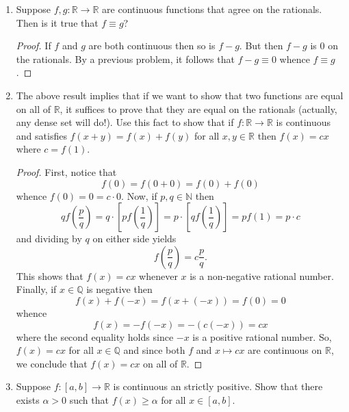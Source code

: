 \documentclass[12pt, reqno]{article}
\numberwithin{equation}{section}
\theoremstyle{definition}
\theoremstyle{remark}
\newcommand{\NN}{\mathbb{N}}
\newcommand{\QQ}{\mathbb{Q}}
\newcommand{\RR}{\mathbb{R}}
\newcommand{\abs}[1]{\left\lvert#1\right\rvert}
\renewcommand{\epsilon}{\varepsilon}
\begin{document}
\begin{enumerate}[leftmargin=*]
\begin{proof}
		      On the other hand, since $f$ is bounded, the Bolzano-Weierstrass theorem implies that $f(x_n)$ has a convergent subsequence $f(x_{n_k})$. By assumption,
		      \[
			      \lim_{n\to\infty} f(x_{n_k}) = L.
		      \]
		      But this contradicts the fact that $\abs{f(x_{n_k}) - L} \geq \epsilon$ for all $k\in\NN$.
	      \end{proof}

	\item Suppose $f, g :\RR\to\RR$ are continuous functions that agree on the rationals. Then is it true that $f \equiv g$?

	      \begin{proof}
		      If $f$ and $g$ are both continuous then so is $f-g$. But then $f-g$ is $0$ on the rationals. By a previous problem, it follows that $f - g\equiv 0$ whence $f\equiv g$.
	      \end{proof}

	\item The above result implies that if we want to show that two functions are equal on all of $\RR$, it suffices to prove that they are equal on the rationals (actually, any dense set will do!). Use this fact to show that if $f:\RR\to\RR$ is continuous and satisfies $f(x+y) = f(x) + f(y)$ for all $x,y\in\RR$ then $f(x) = cx$ where $c = f(1)$.

	      \begin{proof}
		      First, notice that
		      \[
			      f(0) = f(0+0) = f(0) + f(0)
		      \]
		      whence $f(0) = 0 = c\cdot 0$.
		      Now, if $p,q \in \NN$ then
		      \[
			      qf\left(\frac{p}{q}\right) = q\cdot \left[pf\left(\frac{1}{q}\right)\right] = p\cdot\left[qf\left(\frac{1}{q}\right)\right] = pf(1) = p\cdot c
		      \]
		      and dividing by $q$ on either side yields
		      \[
			      f\left(\frac{p}{q}\right) = c\frac{p}{q}.
		      \]
		      This shows that $f(x) = cx$ whenever $x$ is a non-negative rational number. Finally, if $x\in \QQ$ is negative then
		      \[
			      f(x) + f(-x) = f(x+(-x)) = f(0) = 0
		      \]
		      whence
		      \[
			      f(x) = -f(-x)  =-\left(c(-x)\right) = cx
		      \]
		      where the second equality holds since $-x$ is a positive rational number. So, $f(x) = cx$ for all $x\in \QQ$ and since both $f$ and $x\mapsto cx$ are continuous on $\RR$, we conclude that $f(x) = cx$ on all of $\RR$.
	      \end{proof}

	\item Suppose $f:[a,b] \to\RR$ is continuous an strictly positive. Show that there exists $\alpha > 0$ such that $f(x) \geq \alpha$ for all $x\in [a,b]$.


\end{enumerate}
\end{document}
